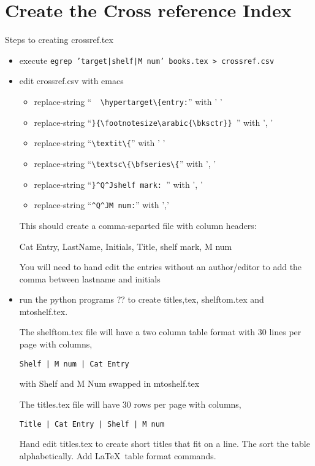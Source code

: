 \documentclass{article}
\begin{document}
\section{Create the Cross reference Index}
Steps to creating crossref.tex
\begin{itemize}
\item execute \texttt{egrep 'target|shelf|M num' books.tex > crossref.csv}
\item edit crossref.csv with emacs
  \begin{itemize}
  \item replace-string ``\verb|  \hypertarget\{entry:|'' with ' '
  \item replace-string ``\verb|}{\footnotesize\arabic{\bksctr}} |'' with ', '
  \item replace-string ``\verb|\textit\{|'' with ' '
  \item replace-string ``\verb|\textsc\{\bfseries\{|'' with ', '
  \item replace-string ``\verb|}^Q^Jshelf mark: |'' with ', '
  \item replace-string ``\verb|^Q^JM num:|'' with ','
  \end{itemize}
  This should create a comma-separted file with column headers:

  Cat Entry, LastName, Initials, Title, shelf mark, M num

  You will need to hand edit the entries without an author/editor to
  add the comma between lastname and initials
\item run the python programs ?? to create titles,tex, shelftom.tex and mtoshelf.tex.

  The shelftom.tex file will have a two column table format with 30 lines per page
  with columns,

  \verb-Shelf | M num | Cat Entry-

  with Shelf and M Num swapped in mtoshelf.tex

  The titles.tex file will have 30 rows per page with columns,

  \verb-Title | Cat Entry | Shelf | M num-

  Hand edit titles.tex to create short titles that fit on a line.  The
  sort the table alphabetically.  Add \LaTeX\ table format commands.

\end{itemize}
\end{document}

